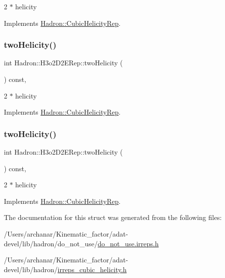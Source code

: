 2 $\ast$ helicity 

Implements \mbox{\hyperlink{structHadron_1_1CubicHelicityRep_af507aa56fc2747eacc8cb6c96db31ecc}{Hadron\+::\+Cubic\+Helicity\+Rep}}.

\mbox{\label{structHadron_1_1H3o2D2ERep_a834909b5a05a1e80078eec2e2349831b}} 
\subsubsection{\texorpdfstring{twoHelicity()}{twoHelicity()}\hspace{0.1cm}{\footnotesize\ttfamily [2/3]}}
{\footnotesize\ttfamily int Hadron\+::\+H3o2\+D2\+E\+Rep\+::two\+Helicity (\begin{DoxyParamCaption}{ }\end{DoxyParamCaption}) const\hspace{0.3cm}{\ttfamily [inline]}, {\ttfamily [virtual]}}

2 $\ast$ helicity 

Implements \mbox{\hyperlink{structHadron_1_1CubicHelicityRep_af507aa56fc2747eacc8cb6c96db31ecc}{Hadron\+::\+Cubic\+Helicity\+Rep}}.

\mbox{\label{structHadron_1_1H3o2D2ERep_a834909b5a05a1e80078eec2e2349831b}} 
\subsubsection{\texorpdfstring{twoHelicity()}{twoHelicity()}\hspace{0.1cm}{\footnotesize\ttfamily [3/3]}}
{\footnotesize\ttfamily int Hadron\+::\+H3o2\+D2\+E\+Rep\+::two\+Helicity (\begin{DoxyParamCaption}{ }\end{DoxyParamCaption}) const\hspace{0.3cm}{\ttfamily [inline]}, {\ttfamily [virtual]}}

2 $\ast$ helicity 

Implements \mbox{\hyperlink{structHadron_1_1CubicHelicityRep_af507aa56fc2747eacc8cb6c96db31ecc}{Hadron\+::\+Cubic\+Helicity\+Rep}}.



The documentation for this struct was generated from the following files\+:\begin{DoxyCompactItemize}
\item 
/\+Users/archanar/\+Kinematic\+\_\+factor/adat-\/devel/lib/hadron/do\+\_\+not\+\_\+use/\mbox{\hyperlink{adat-devel_2lib_2hadron_2do__not__use_2do__not__use_8irreps_8h}{do\+\_\+not\+\_\+use.\+irreps.\+h}}\item 
/\+Users/archanar/\+Kinematic\+\_\+factor/adat-\/devel/lib/hadron/\mbox{\hyperlink{adat-devel_2lib_2hadron_2irreps__cubic__helicity_8h}{irreps\+\_\+cubic\+\_\+helicity.\+h}}\end{DoxyCompactItemize}
